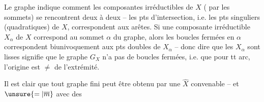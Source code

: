 Le graphe indique comment les composantes irréductibles de $X$ ( par les sommets) se rencontrent deux à deux -- les pts d'intersection, i.e. les pts singuliers (quadratiques) de $X$, correspondent aux arêtes. Si une composante irréductible $X_\alpha$ de $X$ correspond au sommet $\alpha$ du graphe, alors les boucles fermées en $\alpha$ correspondent biunivoquement aux pts doubles de $X_\alpha$ -- donc dire que les $X_\alpha$ sont lisses signifie que le graphe $G_X$ n'a pas de boucles fermées, i.e. que pour tt arc, l'origine est $\neq$ de l'extrémité.

Il est clair que tout graphe fini peut être obtenu   par une $\widehat X$ convenable -- et $\unsure{=|\overline m}$ avec des 
